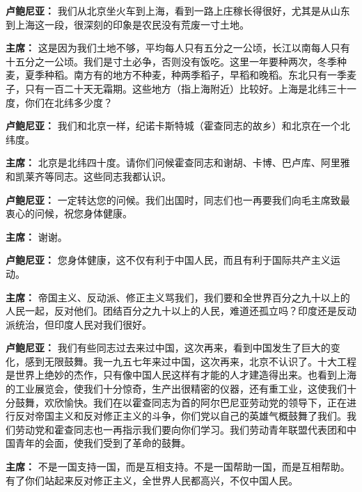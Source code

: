 \begin{duihua}
\item[\textbf{卢鲍尼亚：}] 我们从北京坐火车到上海，看到一路上庄稼长得很好，尤其是从山东到上海这一段，很深刻的印象是农民没有荒废一寸土地。

\item[\textbf{主席：}] 这是因为我们土地不够，平均每人只有五分之一公顷，长江以南每人只有十五分之一公顷。我们是寸土必争，否则没有饭吃。这里一年要种两次，冬季种麦，夏季种稻。南方有的地方不种麦，种两季稻子，早稻和晚稻。东北只有一季麦子，只有一百二十天无霜期。这些地方（指上海附近）比较好。上海是北纬三十一度，你们在北纬多少度？

\item[\textbf{卢鲍尼亚：}] 我们和北京一样，纪诺卡斯特城（霍查同志的故乡）和北京在一个北纬度。

\item[\textbf{主席：}] 北京是北纬四十度。请你们问候霍查同志和谢胡、卡博、巴卢库、阿里雅和凯莱齐等同志。这些同志我都认识。

\item[\textbf{卢鲍尼亚：}] 一定转达您的问候。我们出国时，同志们也一再要我们向毛主席致最衷心的问候，祝您身体健康。

\item[\textbf{主席：}] 谢谢。

\item[\textbf{卢鲍尼亚：}] 您身体健康，这不仅有利于中国人民，而且有利于国际共产主义运动。

\item[\textbf{主席：}] 帝国主义、反动派、修正主义骂我们，我们要和全世界百分之九十以上的人民一起，反对他们。团结百分之九十以上的人民，难道还孤立吗？印度还是反动派统治，但印度人民对我们很好。

\item[\textbf{卢鲍尼亚：}] 我们有些同志过去来过中国，这次再来，看到中国发生了巨大的变化，感到无限鼓舞。我一九五七年来过中国，这次再来，北京不认识了。十大工程是世界上绝妙的杰作，只有像中国人民这样有才能的人才建造得出来。也看到上海的工业展览会，使我们十分惊奇，生产出很精密的仪器，还有重工业，这使我们十分鼓舞，欢欣愉快。我们在以霍查同志为首的阿尔巴尼亚劳动党的领导下，正在进行反对帝国主义和反对修正主义的斗争，你们党以自己的英雄气概鼓舞了我们。我们劳动党和霍查同志也一再指示我们要向你们学习。我们劳动青年联盟代表团和中国青年的会面，使我们受到了革命的鼓舞。

\item[\textbf{主席：}] 不是一国支持一国，而是互相支持。不是一国帮助一国，而是互相帮助。有了你们站起来反对修正主义，全世界人民都高兴，不仅中国人民。


\end{duihua}

